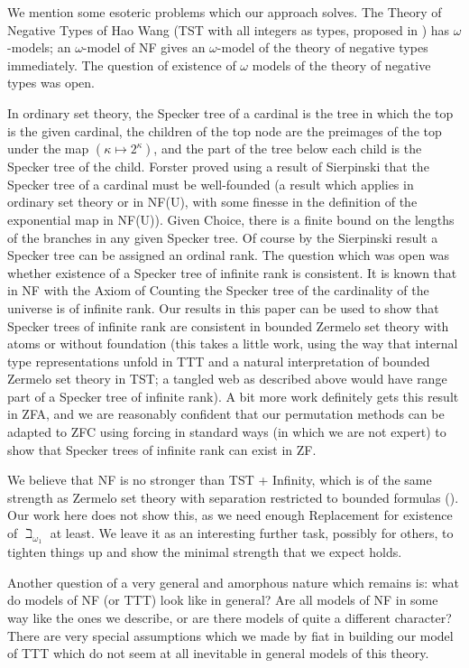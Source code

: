 \documentclass[112pt]{article}
\begin{document}
We mention some esoteric problems which our approach solves.  The Theory of Negative Types of Hao Wang (TST with all integers as types, proposed in \cite{tnt})  has $\omega$-models;  an $\omega$-model of NF gives an $\omega$-model of the theory of negative types  immediately.  The question of existence of $\omega$ models of the theory of negative types was open.

In ordinary set theory, the Specker tree of a cardinal is the tree in which the top is the given cardinal, the children of the top node  are the preimages of the top under the map $(\kappa \mapsto 2^{\kappa})$, and the part of the tree
below each child is the Specker tree of the child.  Forster proved using a result of Sierpinski that the Specker tree of a cardinal must be well-founded (a result which applies in ordinary set theory or in NF(U), with some finesse in the definition of the exponential map in NF(U)).  Given Choice, there is a finite bound on the lengths of the branches in any given Specker tree.  Of course by the Sierpinski result a Specker tree can be assigned an ordinal rank.  The question which was open
was whether existence of a Specker tree of infinite rank is consistent.  It is known that in NF with the Axiom of Counting the Specker tree of the cardinality of the universe is of infinite rank.  Our results in this paper can be used to show that Specker trees of infinite rank are consistent in bounded Zermelo set theory with atoms or without foundation (this takes a little work, using the way that internal type representations unfold in TTT and a natural interpretation of bounded Zermelo set theory in TST;  a tangled web as described above would have range part of a Specker tree of infinite rank).  A bit more work definitely gets this result in ZFA, and we are reasonably confident that our permutation methods can be adapted to ZFC using forcing in standard ways (in which we are not expert) to show that Specker trees of infinite rank can exist in ZF.

We believe that NF is no stronger than TST + Infinity, which is of the same strength as Zermelo set theory with separation restricted to bounded formulas (\cite{kemeny}).  Our work here does not show this, as we need enough Replacement for
existence of $\beth_{\omega_1}$ at least.  We leave it as an interesting further task, possibly for others, to tighten things up and show the minimal strength that we expect holds.

Another question of a very general and amorphous nature which remains is:  what do models of NF (or TTT) look like in general?  Are all models of NF in some way like the ones we describe, or are there models of quite a different character?  There are very special assumptions which we made by fiat in building our model of TTT which do  not seem at all inevitable in general models of this theory.
\end{document}

